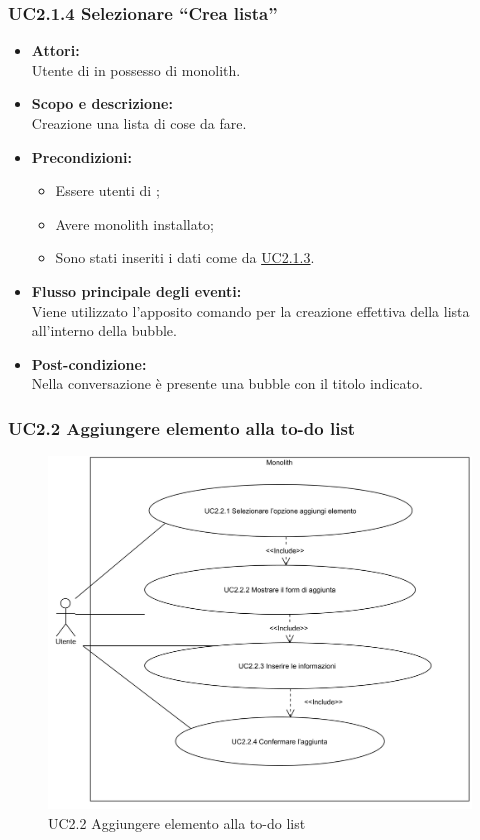 \subsubsection{UC2.1.4 Selezionare “Crea lista”} \label{UC2.1.4}

\begin{itemize}
	\item \textbf{Attori:}
	\\Utente di  in possesso di monolith.
	\item \textbf{Scopo e descrizione:} 
	\\Creazione una lista di cose da fare.
	\item \textbf{Precondizioni:}
	\begin{itemize}
		\item Essere utenti di ;
		\item Avere monolith installato;
		\item Sono stati inseriti i dati come da \hyperref[UC2.1.3]{UC2.1.3}.
	\end{itemize}
	\item \textbf{Flusso principale degli eventi:}
	\\Viene utilizzato l'apposito comando per la creazione effettiva della lista all'interno della bubble.
	\item \textbf{Post-condizione:}
	\\Nella conversazione è presente una bubble  con il titolo indicato. 
\end{itemize}

\subsubsection{UC2.2 Aggiungere elemento alla to-do list} \label{UC2.2}

\begin{figure}[H]
	\centering
	\includegraphics[width=15cm]{../../documenti/AnalisiDeiRequisiti/Diagrammi_img/uc2_2.png}
	\caption{UC2.2 Aggiungere elemento alla to-do list}
\end{figure}

